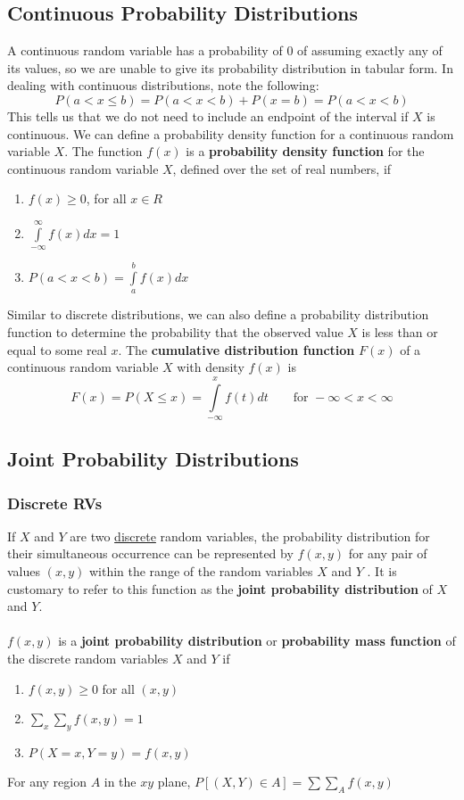 \documentclass[11pt]{article}
\begin{document}
\subsection{Continuous Probability Distributions}
A continuous random variable has a probability of $0$ of assuming exactly any of its values, so we are unable to give its probability distribution in tabular form. In dealing with continuous distributions, note the following:
$$P(a<x\leq b) = P(a<x<b) + P(x=b) = P(a<x<b)$$
This tells us that we do not need to include an endpoint of the interval if $X$ is continuous. We can define a probability density function for a continuous random variable $X$. The function $f(x)$ is a \textbf{probability density function} for the continuous random variable $X$, defined over the set of real numbers, if
\begin{enumerate}
\item $f(x) \geq 0$, for all $x \in R$
\item $\int \limits_{-\infty}^{\infty} f(x) dx = 1$
\item $P(a<x<b) = \int \limits_{a}^{b} f(x) dx $
\end{enumerate}
Similar to discrete distributions, we can also define a probability distribution function to determine the probability that the observed value $X$ is less than or equal to some real $x$. The \textbf{cumulative distribution function} $F(x)$ of a continuous random variable $X$ with density $f(x)$ is 
$$ F(x) = P(X \leq x) = \int \limits_{-\infty}^{x} f(t) dt\quad \quad \text{for } -\infty < x < \infty $$

\subsection{Joint Probability Distributions}
\subsubsection{Discrete RVs}
If $X$ and $Y$ are two \underline{discrete} random variables, the probability distribution for their simultaneous occurrence can be represented by $f(x,y)$ for any pair of values $(x, y)$ within the range of the random variables $X$ and $Y$ . It is customary to refer to this function as the \textbf{joint probability distribution} of $X$ and $Y$. 
\\ \\
$f(x,y)$ is a \textbf{joint probability distribution} or \textbf{probability mass function} of the discrete random variables $X$ and $Y$ if
\begin{enumerate}
\item $f(x,y) \geq 0$ for all $(x,y)$
\item $\sum_x \sum_y f(x,y) = 1$
\item $P(X=x, Y=y) = f(x,y)$
\end{enumerate}
For any region $A$ in the $xy$ plane, $P[(X, Y) \in A] = \sum \sum_A f(x,y)$
\end{document}
